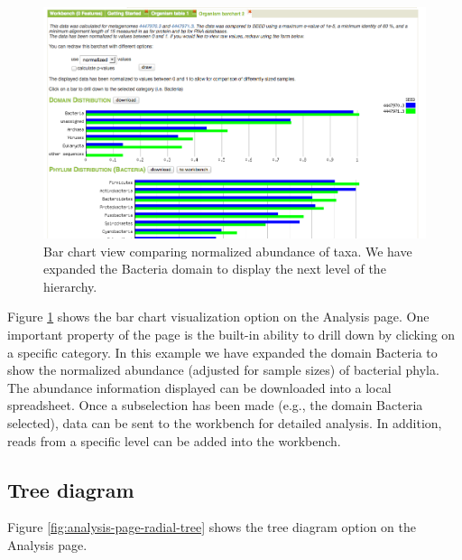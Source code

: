 \documentclass[12pt,fullpage]{report}
\begin{document}
\begin{figure}
\begin{center}
\includegraphics[width=6in]{Images/analysis-page-bar-chart.png}
\end{center}
\caption{
Bar chart view comparing normalized abundance of taxa. We have expanded the Bacteria domain to display the next level of the hierarchy.
}
\label{fig:analysis-page-bar-chart}
\end{figure}

Figure \ref{fig:analysis-page-bar-chart} shows the bar chart visualization option on the Analysis page. One important property of the page is the built-in ability to drill down by clicking on a specific category. In this example we have expanded the domain Bacteria to show the normalized abundance (adjusted for sample sizes) of bacterial phyla. The abundance information displayed can be downloaded into a local spreadsheet. Once a subselection has been made (e.g., the domain Bacteria selected), data can be sent to the workbench for detailed analysis.
In addition, reads from a specific level can be added into the workbench.
\subsection{Tree diagram}

Figure \ref{fig:analysis-page-radial-tree}
shows the tree diagram option on the Analysis page.
\end{document}
